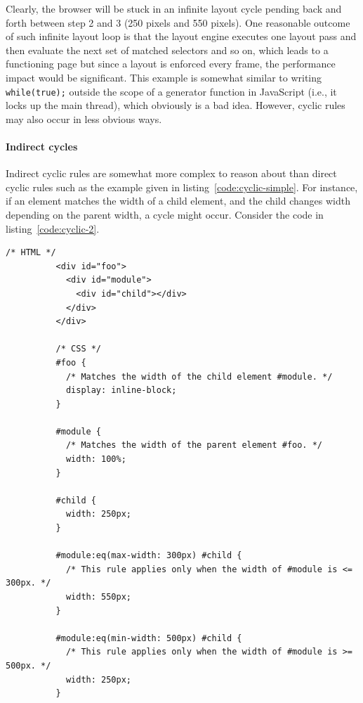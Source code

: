 \documentclass[a4paper,11pt]{kth-mag}
\newcommand{\code}[1]{\texttt{#1}}
\begin{document}
        Clearly, the \gls{browser} will be stuck in an infinite layout cycle pending back and forth between step 2 and 3 (250 pixels and 550 pixels).
        One reasonable outcome of such infinite layout loop is that the \gls{layout engine} executes one layout pass and then evaluate the next set of matched selectors and so on, which leads to a functioning page but since a layout is enforced every frame, the performance impact would be significant.
        This example is somewhat similar to writing \code{while(true);} outside the scope of a generator function in \gls{JavaScript} (i.e., it locks up the main thread), which obviously is a bad idea.
        However, cyclic rules may also occur in less obvious ways.

        \paragraph{Indirect cycles}
        Indirect cyclic rules are somewhat more complex to reason about than direct cyclic rules such as the example given in listing~\ref{code:cyclic-simple}.
        For instance, if an \gls{element} matches the width of a child \gls{element}, and the child changes width depending on the parent width, a cycle might occur.
        Consider the code in listing~\ref{code:cyclic-2}.
        \begin{lstlisting}[gobble=10,caption={Example of indirect cyclic rules. Here the user (\code{\#foo}) of the module (\code{\#module}) creates cyclic rules indirectly by specifying that it should match the width of the module.}, captionpos=b, label={code:cyclic-2}]
          /* HTML */
          <div id="foo">
            <div id="module">
              <div id="child"></div>
            </div>
          </div>

          /* CSS */
          #foo {
            /* Matches the width of the child element #module. */
            display: inline-block;
          }

          #module {
            /* Matches the width of the parent element #foo. */
            width: 100%;
          }

          #child {
            width: 250px;
          }

          #module:eq(max-width: 300px) #child {
            /* This rule applies only when the width of #module is <= 300px. */
            width: 550px;
          }

          #module:eq(min-width: 500px) #child {
            /* This rule applies only when the width of #module is >= 500px. */
            width: 250px;
          }
        \end{lstlisting}
\end{document}
